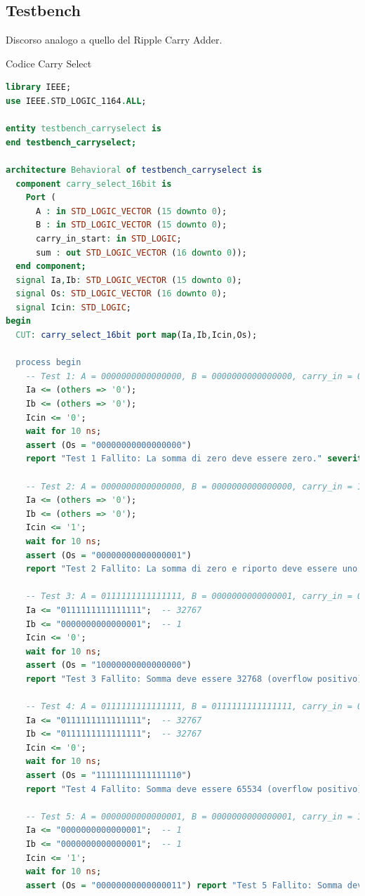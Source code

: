 \subsection{Testbench}
Discorso analogo a quello del Ripple Carry Adder.
\begin{problem}{Codice Carry Select}{}
\begin{lstlisting}[language=VHDL]
library IEEE;
use IEEE.STD_LOGIC_1164.ALL;

entity testbench_carryselect is
end testbench_carryselect;

architecture Behavioral of testbench_carryselect is
  component carry_select_16bit is
    Port ( 
      A : in STD_LOGIC_VECTOR (15 downto 0);
      B : in STD_LOGIC_VECTOR (15 downto 0);
      carry_in_start: in STD_LOGIC;
      sum : out STD_LOGIC_VECTOR (16 downto 0));
  end component;
  signal Ia,Ib: STD_LOGIC_VECTOR (15 downto 0);
  signal Os: STD_LOGIC_VECTOR (16 downto 0);
  signal Icin: STD_LOGIC;
begin
  CUT: carry_select_16bit port map(Ia,Ib,Icin,Os);
    
  process begin    
    -- Test 1: A = 0000000000000000, B = 0000000000000000, carry_in = 0
    Ia <= (others => '0'); 
    Ib <= (others => '0'); 
    Icin <= '0';
    wait for 10 ns;
    assert (Os = "00000000000000000")
    report "Test 1 Fallito: La somma di zero deve essere zero." severity error;

    -- Test 2: A = 0000000000000000, B = 0000000000000000, carry_in = 1
    Ia <= (others => '0'); 
    Ib <= (others => '0'); 
    Icin <= '1';
    wait for 10 ns;
    assert (Os = "00000000000000001") 
    report "Test 2 Fallito: La somma di zero e riporto deve essere uno." severity error;

    -- Test 3: A = 0111111111111111, B = 0000000000000001, carry_in = 0
    Ia <= "0111111111111111";  -- 32767
    Ib <= "0000000000000001";  -- 1
    Icin <= '0';
    wait for 10 ns;
    assert (Os = "10000000000000000") 
    report "Test 3 Fallito: Somma deve essere 32768 (overflow positivo)." severity error;

    -- Test 4: A = 0111111111111111, B = 0111111111111111, carry_in = 0
    Ia <= "0111111111111111";  -- 32767
    Ib <= "0111111111111111";  -- 32767
    Icin <= '0';
    wait for 10 ns;
    assert (Os = "11111111111111110") 
    report "Test 4 Fallito: Somma deve essere 65534 (overflow positivo)." severity error;

    -- Test 5: A = 0000000000000001, B = 0000000000000001, carry_in = 1
    Ia <= "0000000000000001";  -- 1
    Ib <= "0000000000000001";  -- 1
    Icin <= '1';
    wait for 10 ns;
    assert (Os = "00000000000000011") report "Test 5 Fallito: Somma deve essere 3 con riporto." severity error;


\end{lstlisting}
\end{problem}
